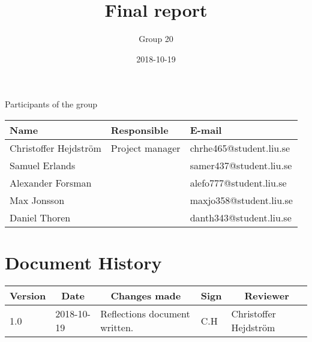 \documentclass[10pt,oneside,english]{lips}
\title{Final report}
\author{Group 20}
\date{2018-10-19}
\begin{document}
  \setlength\parindent{0pt}
  \maketitle
  
  \cleardoublepage
  \makeprojectid
  
  \begin{center}
    \Large Participants of the group
  \end{center}
  \begin{center}
    \begin{tabular}{|l|l|l|}
      \hline
      \textbf{Name} & \textbf{Responsible} & \textbf{E-mail}\\ \hline
      Christoffer Hejdström & Project manager & chrhe465@student.liu.se \\ \hline
      Samuel Erlands & & samer437@student.liu.se \\ \hline
      Alexander Forsman & & alefo777@student.liu.se\\ \hline
      Max Jonsson & & maxjo358@student.liu.se\\ \hline
      Daniel Thoren & & danth343@student.liu.se\\
      \hline
    \end{tabular}
  \end{center}
  
  
  \cleardoublepage
  \tableofcontents
  
  \cleardoublepage
  \section*{Document History}
  \begin{tabular}{p{}|p{}|p{}|p{}|p{}} 
    \multicolumn{1}{c}{\bfseries Version} & 
    \multicolumn{1}{|c}{\bfseries Date} & 
    \multicolumn{1}{|c}{\bfseries Changes made} & 
    \multicolumn{1}{|c}{\bfseries Sign} & 
    \multicolumn{1}{|c}{\bfseries Reviewer}\\
    \hline
    \hline
    1.0 & 2018-10-19 & Reflections document written. & C.H & Christoffer Hejdström \\ \hline
  \end{tabular}
  
  \cleardoublepage
  \cfoot{\thepage}
  
    
  
  
  
  
  \clearpage
  
  \cleardoublepage
  \appendix
  
  
\end{document}
